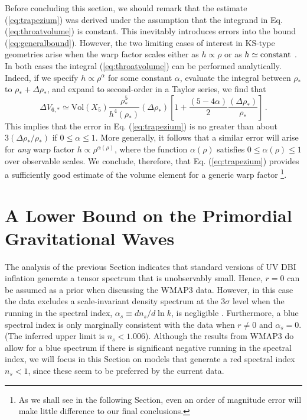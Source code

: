 Before concluding this section, we should remark that 
the estimate (\ref{eq:trapezium}) was derived under the assumption  
that the integrand in Eq. (\ref{eq:throatvolume})  
is constant. This inevitably introduces errors into the bound
(\ref{eq:generalbound}). However, the two limiting cases of interest 
in KS-type geometries arise 
when the warp factor scales either as $h \propto \rho$
or as $h \simeq {\rm constant}$ \cite{ks,kt}. In both cases
the integral (\ref{eq:throatvolume}) can be performed analytically. 
Indeed, if we specify $h \propto \rho^{\alpha}$ for some constant $\alpha$,  
evaluate the integral between $\rho_{*}$ 
to $\rho_{*}+\Delta \rho_{*}$, and expand to second-order in a 
Taylor series, we find that  
% 
\begin{equation}
\label{eq:limits}
\Delta V_{6,*} \simeq \mathrm{Vol}(X_5) \frac{\rho^5_{*}}{h^{4} 
(\rho_{*} )}(\Delta \rho_*) 
\left[ 1 +\frac{(5-4 \alpha )}{2} 
\frac{(\Delta \rho_*)}{\rho_{*}} \right]  \,.
\end{equation}
% 
This implies that the error in Eq. (\ref{eq:trapezium}) 
is no greater than 
about $3 (\Delta \rho_* / \rho_*)$ if  
$0 \le \alpha \le 1$. More generally, it follows that a similar
error will arise for {\em any} warp factor 
$h \propto \rho^{\alpha (\rho )}$, where the function 
$\alpha (\rho)$ satisfies $0 \le \alpha (\rho ) \le 1$ 
over observable scales. 
We conclude, therefore, that Eq. (\ref{eq:trapezium}) 
provides a sufficiently good estimate of the volume element  
for a generic warp factor
\footnote{As we shall see in the following Section, 
even an order of magnitude error will make little 
difference to our final conclusions.}.  
% 
% 
% 
% 
\section{A Lower Bound on the Primordial Gravitational Waves} 
% 
\label{sec:lower-dbi}

The analysis of the previous Section 
indicates that standard versions of UV DBI inflation generate a 
tensor spectrum that is unobservably 
small. Hence, $r=0$ can be assumed as a prior 
when discussing the WMAP3 data. 
However, in this case the data 
excludes a scale-invariant density spectrum at the $3 \sigma$ level
when the running in the spectral index, $\alpha_s \equiv dn_s/d\ln k$, 
is negligible \cite{spergel}.  
Furthermore, a blue spectral index 
is only marginally consistent with the data when $r\ne 0$ and $\alpha_s=0$. 
(The inferred upper limit is $n_s < 1.006$).
Although the results from WMAP3 do allow for a blue spectrum if there is 
significant negative running in the spectral index, we will 
focus in this Section 
on models that generate a red spectral index $n_s<1$, since these seem 
to be preferred by the current data.   


